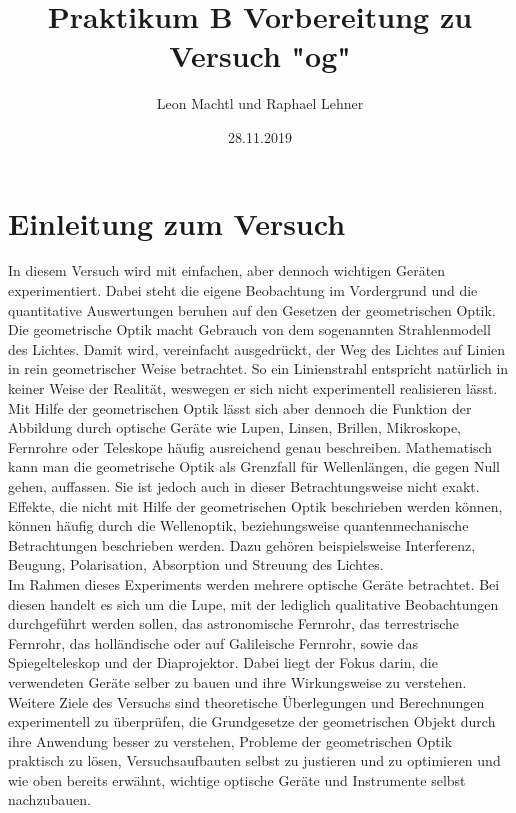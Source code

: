 \documentclass[a4paper,10pt]{scrartcl}
\title{Praktikum B Vorbereitung zu Versuch "og"}
\author{Leon Machtl und Raphael Lehner}
\date{28.11.2019}
\begin{document}
	\maketitle
	\tableofcontents
	\newpage
	
	\section{Einleitung zum Versuch}
		In diesem Versuch wird mit einfachen, aber dennoch wichtigen Geräten experimentiert. Dabei steht die eigene Beobachtung im Vordergrund und die quantitative Auswertungen beruhen auf den Gesetzen der geometrischen Optik. Die geometrische Optik macht Gebrauch von dem sogenannten Strahlenmodell des Lichtes. Damit wird, vereinfacht ausgedrückt, der Weg des Lichtes auf Linien in rein geometrischer Weise betrachtet. So ein Linienstrahl entspricht natürlich in keiner Weise der Realität, weswegen er sich nicht experimentell realisieren lässt. Mit Hilfe der geometrischen Optik lässt sich aber dennoch die Funktion der Abbildung durch optische Geräte wie Lupen, Linsen, Brillen, Mikroskope, Fernrohre oder Teleskope häufig ausreichend genau beschreiben. Mathematisch kann man die geometrische Optik als Grenzfall für Wellenlängen, die gegen Null gehen, auffassen. Sie ist jedoch auch in dieser Betrachtungsweise nicht exakt. Effekte, die nicht mit Hilfe der geometrischen Optik beschrieben werden können, können häufig durch die Wellenoptik, beziehungsweise quantenmechanische Betrachtungen beschrieben werden. Dazu gehören beispielsweise Interferenz, Beugung, Polarisation, Absorption und Streuung des Lichtes. \\
		Im Rahmen dieses Experiments werden mehrere optische Geräte betrachtet. Bei diesen handelt es sich um die Lupe, mit der lediglich qualitative Beobachtungen durchgeführt werden sollen, das astronomische Fernrohr, das terrestrische Fernrohr, das holländische oder auf Galileische Fernrohr, sowie das Spiegelteleskop und der Diaprojektor. Dabei liegt der Fokus darin, die verwendeten Geräte selber zu bauen und ihre Wirkungsweise zu verstehen.\\
		Weitere Ziele des Versuchs sind theoretische Überlegungen und Berechnungen experimentell zu überprüfen, die Grundgesetze der geometrischen Objekt durch ihre Anwendung besser zu verstehen, Probleme der geometrischen Optik praktisch zu lösen, Versuchsaufbauten selbst zu justieren und zu optimieren und wie oben bereits erwähnt, wichtige optische Geräte und Instrumente selbst nachzubauen.
		
\end{document}
